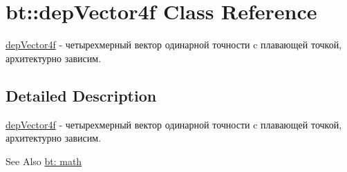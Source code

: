 \hypertarget{classbt_1_1dep_vector4f}{\section{bt\-:\-:dep\-Vector4f Class Reference}
\label{classbt_1_1dep_vector4f}
}


\hyperlink{classbt_1_1dep_vector4f}{dep\-Vector4f} -\/ четырехмерный вектор одинарной точности c плавающей точкой, архитектурно зависим.  




\subsection{Detailed Description}
\hyperlink{classbt_1_1dep_vector4f}{dep\-Vector4f} -\/ четырехмерный вектор одинарной точности c плавающей точкой, архитектурно зависим. 

\begin{DoxySeeAlso}{See Also}
\hyperlink{group__math}{bt\-: math} 
\end{DoxySeeAlso}
